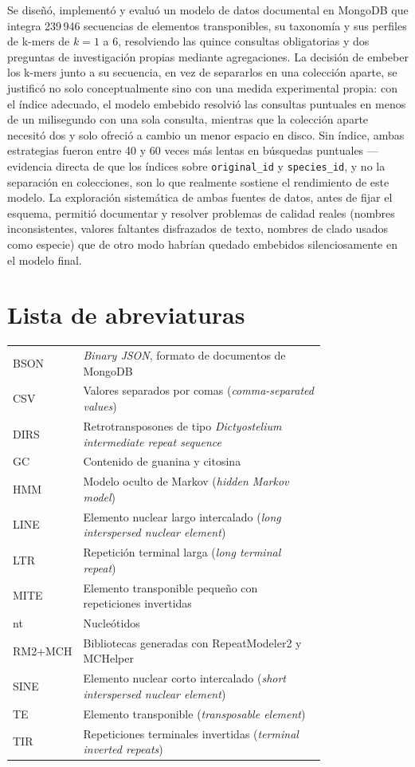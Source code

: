 \documentclass[pdflatex,sn-vancouver-num,lineno,referee]{sn-jnl}
\begin{document}
Se diseñó, implementó y evaluó un modelo de datos documental en MongoDB que
integra 239\,946 secuencias de elementos transponibles, su taxonomía y sus
perfiles de k-mers de $k=1$ a $6$, resolviendo las quince consultas
obligatorias y dos preguntas de investigación propias mediante agregaciones.
La decisión de embeber los k-mers junto a su secuencia, en vez de separarlos
en una colección aparte, se justificó no solo conceptualmente sino con una
medida experimental propia: con el índice adecuado, el modelo embebido
resolvió las consultas puntuales en menos de un milisegundo con una sola
consulta, mientras que la colección aparte necesitó dos y solo ofreció a
cambio un menor espacio en disco. Sin índice, ambas estrategias fueron entre
40 y 60 veces más lentas en búsquedas puntuales --- evidencia directa de que
los índices sobre \texttt{original\_id} y \texttt{species\_id}, y no la
separación en colecciones, son lo que realmente sostiene el rendimiento de
este modelo. La exploración sistemática de ambas
fuentes de datos, antes de fijar el esquema, permitió documentar y resolver
problemas de calidad reales (nombres inconsistentes, valores faltantes
disfrazados de texto, nombres de clado usados como especie) que de otro modo
habrían quedado embebidos silenciosamente en el modelo final.

\section*{Lista de abreviaturas}

\noindent
\begin{tabular}{@{}lp{0.78\linewidth}@{}}
BSON & \emph{Binary JSON}, formato de documentos de MongoDB \\
CSV & Valores separados por comas (\emph{comma-separated values}) \\
DIRS & Retrotransposones de tipo \emph{Dictyostelium intermediate repeat sequence} \\
GC & Contenido de guanina y citosina \\
HMM & Modelo oculto de Markov (\emph{hidden Markov model}) \\
LINE & Elemento nuclear largo intercalado (\emph{long interspersed nuclear element}) \\
LTR & Repetición terminal larga (\emph{long terminal repeat}) \\
MITE & Elemento transponible pequeño con repeticiones invertidas \\
nt & Nucleótidos \\
RM2+MCH & Bibliotecas generadas con RepeatModeler2 y MCHelper \\
SINE & Elemento nuclear corto intercalado (\emph{short interspersed nuclear element}) \\
TE & Elemento transponible (\emph{transposable element}) \\
TIR & Repeticiones terminales invertidas (\emph{terminal inverted repeats}) \\
\end{tabular}
\end{document}
